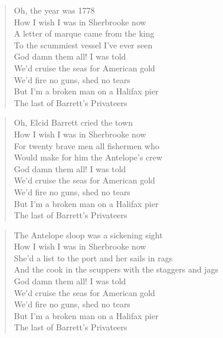 \documentclass[8pt,twoside]{extarticle}
\newenvironment{xverse}{
	\penalty 10000
	\begin{verse}
	\parskip 4pt
	}
	{
	\end{verse}
	\penalty 0
	}
\begin{document}
\begin{xverse}
Oh, the year was 1778 \\
How I wish I was in Sherbrooke now \\
A letter of marque came from the king \\
To the scummiest vessel I've ever seen \\
God damn them all! I was told \\
We'd cruise the seas for American gold \\
We'd fire no guns, shed no tears \\
But I'm a broken man on a Halifax pier \\
The last of Barrett's Privateers \\
\end{xverse}

\begin{xverse}
Oh, Elcid Barrett cried the town \\
How I wish I was in Sherbrooke now \\
For twenty brave men all fishermen who \\
Would make for him the Antelope's crew \\
God damn them all! I was told \\
We'd cruise the seas for American gold \\
We'd fire no guns, shed no tears \\
But I'm a broken man on a Halifax pier \\
The last of Barrett's Privateers \\
\end{xverse}

\begin{xverse}
The Antelope sloop was a sickening sight \\
How I wish I was in Sherbrooke now \\
She'd a list to the port and her sails in rags \\
And the cook in the scuppers with the staggers and jags \\
God damn them all! I was told \\
We'd cruise the seas for American gold \\
We'd fire no guns, shed no tears \\
But I'm a broken man on a Halifax pier \\
The last of Barrett's Privateers \\
\end{xverse}
\end{document}
